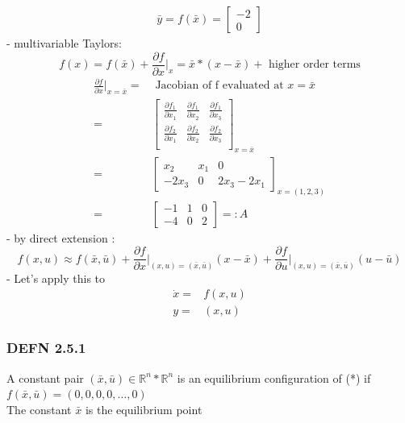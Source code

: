 \documentclass[letterpaper]{article}
\begin{document}
\begin{align*}
	\bar y=f(\bar x)=\begin{bmatrix}-2 \\0\end{bmatrix}
\end{align*}
- multivariable Taylors: $$f(x)=f(\bar x)+\frac{\partial f}{\partial x}\vert_x=\bar x*(x-\bar x)+\text{ higher order terms}$$
\begin{align*}
	\frac{\partial f}{\partial x}\vert_{x=\bar x}=&\text{ Jacobian of f evaluated at }x=\bar x\\
	=&\begin{bmatrix}
	\frac{\partial f_1}{\partial x_1} & \frac{\partial f_1}{\partial x_2} & \frac{\partial f_1}{\partial x_3} \\
	\frac{\partial f_2}{\partial x_1} & \frac{\partial f_2}{\partial x_2} & \frac{\partial f_2}{\partial x_3} \\
	\end{bmatrix}_{x=\bar x}\\
	=&\begin{bmatrix}
	x_2                               & x_1                               & 0                                 \\
	-2x_3                             & 0                                 & 2x_3-2x_1                         
	\end{bmatrix}_{x=(1,2,3)}\\
	=&\begin{bmatrix}
	-1                                & 1                                 & 0                                 \\
	-4                                & 0                                 & 2                                 
	\end{bmatrix}=: A
\end{align*}
- by direct extension : $$f(x,u)\approx f(\bar x, \bar u)+\frac{\partial f}{\partial x}\vert_{(x,u)=(\bar x,\bar u)}(x-\bar x)+\frac{\partial f}{\partial u}\vert_{(x,u)=(\bar x,\bar u)}(u-\bar u)$$
- Let's apply this to 
\begin{align*}
	\dot x= & f(x,u) \\
	y=      & (x,u)  
\end{align*}
\subsubsection*{DEFN 2.5.1} A constant pair $(\bar x, \bar u)\in \mathbb{R}^n*\mathbb{R}^n$ is an equilibrium configuration of (*) if $f(\bar x, \bar u)=(0,0,0,0,\hdots,0)$\\
The constant $\bar x$ is the equilibrium point
\end{document}
